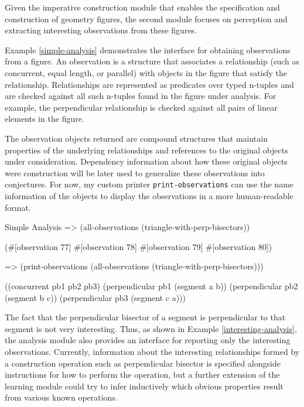 Given the imperative construction module that enables the
specification and construction of geometry figures, the second module
focuses on perception and extracting interesting observations from
these figures.

Example \ref{simple-analysis} demonstrates the interface for obtaining
observations from a figure. An observation is a structure that
associates a relationship (such as concurrent, equal length, or
parallel) with objects in the figure that satisfy the
relationship. Relationships are represented as predicates over typed
n-tuples and are checked against all such n-tuples found in the figure
under analysis. For example, the perpendicular relationship is checked
against all pairs of linear elements in the figure.

The observation objects returned are compound structures that maintain
properties of the underlying relationships and references to the
original objects under consideration. Dependency information about how
these original objects were construction will be later used to
generalize these observations into conjectures. For now, my custom
printer \texttt{print-observations} can use the name information of
the objects to display the observations in a more human-readable
format.

\begin{repl-example}
[label=simple-analysis]
{Simple Analysis}
=> (all-observations (triangle-with-perp-bisectors))

(#[observation 77] #[observation 78] #[observation 79] #[observation 80])

=> (print-observations (all-observations (triangle-with-perp-bisectors)))

((concurrent pb1 pb2 pb3)
 (perpendicular pb1 (segment a b))
 (perpendicular pb2 (segment b c))
 (perpendicular pb3 (segment c a)))
\end{repl-example}

The fact that the perpendicular bisector of a segment is perpendicular
to that segment is not very interesting. Thus, as shown in Example
\ref{interesting-analysis}, the analysis module also provides an
interface for reporting only the interesting observations. Currently,
information about the interesting relationships formed by a
construction operation such as perpendicular bisector is specified
alongside instructions for how to perform the operation, but a further
extension of the learning module could try to infer inductively which
obvious properties result from various known operations.

